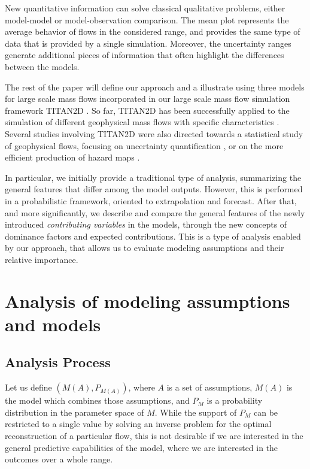 \documentclass{article}
\begin{document}
New quantitative information can solve classical qualitative problems, either model-model or model-observation comparison. The mean plot represents the average behavior of flows in the considered range, and provides the same type of data that is provided by a single simulation. Moreover, the uncertainty ranges generate additional pieces of information that often highlight the differences between the models.


The rest of the paper will define our approach and a illustrate using three models for large scale mass flows incorporated in our large scale mass flow simulation framework  TITAN2D \citep{Patra2005,Patra2006, Yu2009, Aghakhani2016}.
So far, TITAN2D has been successfully applied to the simulation of different geophysical mass flows with specific characteristics \citep{Sheridan2005, Rupp2006, Norini2008, Charbonnier2009, Procter2010, Sheridan2010, Sulpizio2010, Capra2011}. Several studies involving TITAN2D were also directed towards a statistical study of geophysical flows, focusing on uncertainty quantification \citep{Dalbey2008, Dalbey2009, Stefanescu2012b, Stefanescu2012a}, or on the more efficient production of hazard maps \citep{Bayarri2009, Spiller2014, Bayarri2015, Ogburn2016}.

In particular, we initially provide a traditional type of analysis, summarizing the general features that differ among the model outputs. However, this is performed in a probabilistic framework, oriented to extrapolation and forecast. After that, and more significantly, we describe and compare the general features of the newly introduced \emph{contributing variables} in the models, through the new concepts of dominance factors and expected contributions. This is a type of analysis enabled by our approach, that allows us to evaluate modeling assumptions and their relative importance.

\section{Analysis of modeling assumptions and models }
\subsection{Analysis Process}
Let us define $\left(M(A), P_{M(A)}\right)$, where $A$ is a set of assumptions, $M(A)$ is the model which combines those assumptions, and $P_M$ is a probability distribution in the parameter space of $M$. While the support of $P_M$ can be restricted to a single value by solving an inverse problem for the optimal reconstruction of a particular flow, this is not desirable if we are interested in the general predictive capabilities of the model, where we are interested in the outcomes over a whole range.
\end{document}
